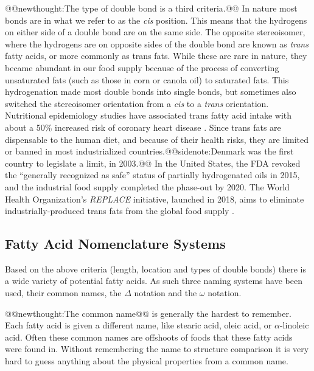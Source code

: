 \documentclass{tufte-handout}
\makeatletter
\def\newthought#1{@@newthought:#1@@}
\def\sidenote#1{@@sidenote:#1@@}
\makeatother
\begin{document}
\newthought{The type of double bond is a third criteria.}  In nature most bonds are in what we refer to as the \textit{cis} position.  This means that the hydrogens on either side of a double bond are on the same side.  The opposite stereoisomer, where the hydrogens are on opposite sides of the double bond are known as \textit{trans} fatty acids, or more commonly as trans fats.  While these are rare in nature, they became abundant in our food supply because of the process of converting unsaturated fats (such as those in corn or canola oil) to saturated fats.  This hydrogenation made most double bonds into single bonds, but sometimes also switched the stereoisomer orientation from a \textit{cis} to a \textit{trans} orientation.  Nutritional epidemiology studies have associated trans fatty acid intake with about a 50\% increased risk of coronary heart disease \citep{Willett1993,D.2006}.  Since trans fats are dispensable to the human diet, and because of their health risks, they are limited or banned in most industrialized countries.\sidenote{Denmark was the first country to legislate a limit, in 2003.} In the United States, the FDA revoked the ``generally recognized as safe'' status of partially hydrogenated oils in 2015, and the industrial food supply completed the phase-out by 2020. The World Health Organization's \textit{REPLACE} initiative, launched in 2018, aims to eliminate industrially-produced trans fats from the global food supply \citep{steeleEndingTransFat2024}.

\subsection{Fatty Acid Nomenclature Systems}

Based on the above criteria (length, location and types of double bonds) there is a wide variety of potential fatty acids.  As such three naming systems have been used, their common names, the $\Delta$ notation and the $\omega$ notation.  

\newthought{The common name} is generally the hardest to remember.  Each fatty acid is given a different name, like stearic acid, oleic acid, or $\alpha$-linoleic acid.  Often these common names are offshoots of foods that these fatty acids were found in.  Without remembering the name to structure comparison it is very hard to guess anything about the physical properties from a common name.
\end{document}
